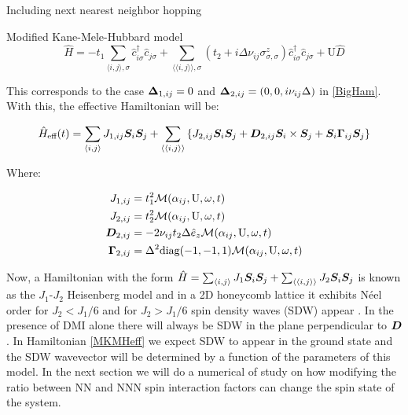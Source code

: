 \begin{section}{Including next nearest neighbor hopping}
\begin{subsection}{Modified Kane-Mele-Hubbard model}
\begin{equation}
\label{MKMH}
\hat{H} = - t_1\sum_{\langle i,j \rangle, \sigma} \hat{c}_{i \sigma}^\dagger \hat{c}_{j \sigma} + 
	\sum_{\langle \langle i,j \rangle \rangle, \sigma}(t_2 + i\Delta\nu_{ij}\sigma^z_{\sigma, \sigma})\hat{c}_{i \sigma}^\dagger \hat{c}_{j \sigma} + 
	\text{U}\hat{D}
\end{equation}

This corresponds to the case $\boldsymbol{\Delta}_{1,ij} = 0$ and $\boldsymbol{\Delta}_{2,ij} = (0, 0, i \nu_{ij} \Delta)$ in \ref{BigHam}. With this, the effective Hamiltonian will be:

\begin{equation}
\label{MKMHeff}
\hat{H}_{\text{eff}}(t) = \sum_{\langle i,j \rangle} J_{1,ij}\boldsymbol{S}_i\boldsymbol{S}_j + \sum_{\langle \langle i,j \rangle \rangle} \left\{ J_{2,ij}\boldsymbol{S}_i\boldsymbol{S}_j + \boldsymbol{D}_{2,ij} \boldsymbol{S}_i \times \boldsymbol{S}_j + \boldsymbol{S}_i \boldsymbol{\Gamma}_{ij} \boldsymbol{S}_j \right\}
\end{equation}

Where:

\begin{align*}
J_{1,ij} &= t_1^2\mathcal{M}(\alpha_{ij}, \text{U}, \omega, t) \\
J_{2,ij} &= t_2^2\mathcal{M}(\alpha_{ij}, \text{U}, \omega, t) \\
\boldsymbol{D}_{2,ij} &= - 2\nu_{ij} t_2 \Delta \hat{e}_z \mathcal{M}(\alpha_{ij}, \text{U}, \omega, t) \\
\boldsymbol{\Gamma}_{2,ij} &= \Delta^2 \text{diag}(-1,-1,1) \mathcal{M}(\alpha_{ij}, \text{U}, \omega, t) 
\end{align*}

Now, a Hamiltonian with the form $\hat{H} = \sum_{\langle i,j \rangle} J_1 \boldsymbol{S}_i\boldsymbol{S}_j + \sum_{\langle \langle i,j \rangle \rangle} J_2\boldsymbol{S}_i\boldsymbol{S}_j$ is known as the $J_1$-$J_2$ Heisenberg model and in a 2D honeycomb lattice it exhibits N\'eel order for $J_2 < J_1 / 6$ and for $J_2 > J_1 / 6$ spin density waves (SDW) appear \cite{Mulder2010}. In the presence of DMI alone there will always be SDW in the plane perpendicular to $\boldsymbol{D}$ \cite{Uchida2006}. In Hamiltonian \ref{MKMHeff} we expect SDW to appear in the ground state and the SDW wavevector will be determined by a function of the parameters of this model. In the next section we will do a numerical of study on how modifying the ratio between NN and NNN spin interaction factors can change the spin state of the system.

\end{subsection}

\end{section}